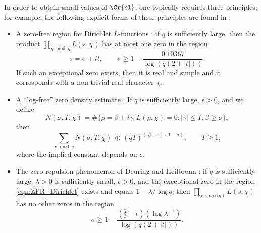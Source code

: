 \documentclass[12pt,psamsfonts]{amsart}
\theoremstyle{definition}
\theoremstyle{remark}
\numberwithin{equation}{section}
\theoremstyle{plain}
\theoremstyle{remark}
\renewcommand{\1}{ {\bf 1}}
\renewcommand{\pmod}[1]{\, (\mathrm{mod} {\, #1})}
\newcommand{\R}{\mathbb{R}}
\newcommand{\asif}[1]{\color{red} {\bf Asif:} #1 \color{black}}
\newcommand{\jesse}[1]{\color{blue} {\bf Jesse:} #1 \color{black}}
\begin{document}
In order to obtain small values of $\Cr{c1}$, one typically requires three principles; for example, the following explicit forms of these principles are found in \cite[Section 1]{HBLinnik}:
\begin{itemize}
\item A zero-free region for Dirichlet $L$-functions \cite{Chen}:  if $q$ is sufficiently large, then the product $\prod_{\chi\bmod q}L(s,\chi)$ has at most one zero in the region
\begin{equation}
\label{eqn:ZFR_Dirichlet}
s=\sigma+it,\qquad \sigma\geq1-\frac{0.10367}{\log(q(2+|t|))}.
\end{equation}
If such an exceptional zero exists, then it is real and simple and it corresponds with a non-trivial real character $\chi$.
\item A ``log-free'' zero density estimate \cite{Huxley, Jutila}:   If $q$ is sufficiently large, $\epsilon>0$, and we define
\[
N(\sigma,T,\chi)=\#\{\rho=\beta+i\gamma:L(\rho,\chi)=0,|\gamma|\leq T,\beta\geq\sigma\},
\]
then
\begin{equation}
\label{eqn:LFZDE_Dirichlet}
\sum_{\chi\bmod q}N(\sigma,T,\chi)\ll (qT)^{(\frac{12}{5}+\epsilon)(1-\sigma)},\qquad T\geq1,
\end{equation}
where the implied constant depends on $\epsilon$.
\item The zero repulsion phenomenon of Deuring and Heilbronn \cite[Chapter 10]{Graham1}:  if $q$ is sufficiently large, $\lambda>0$ is sufficiently small, $\epsilon>0$, and the exceptional zero in the region \eqref{eqn:ZFR_Dirichlet} exists and equals $1-\lambda/\log q$, then $\prod_{\chi\pmod q}L(s,\chi)$ has no other zeros in the region
\begin{equation}
\label{eqn:DH_Dirichlet}
\sigma\geq1-\frac{(\frac{2}{3}-\epsilon)(\log \lambda^{-1})}{\log(q(2+|t|))}.
\end{equation}
\end{itemize}
\end{document}
